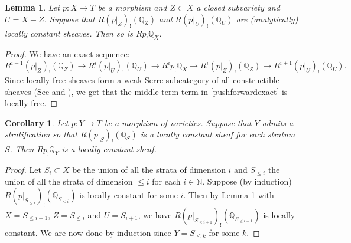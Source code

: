\documentclass[11pt]{amsart}
\newtheorem{corollary}[thm]{Corollary}
\newtheorem{lemma}[thm]{Lemma}
\newcommand{\bQ}{\mathbb{Q}}
\newcommand{\bN}{\mathbb{N}}
\numberwithin{equation}{section}
\renewcommand{\leq}{\leqslant}
\begin{document}
\begin{lemma} \label{lemmalocallyconstantinductionstep}
	Let $p: X \to T$ be a morphism and $Z \subset X$ a closed subvariety and $U = X-Z$. Suppose that $R(p|_Z)_!(\bQ_Z)$ and $R(p|_U)_!(\bQ_U)$ are (analytically) locally constant sheaves. Then so is $Rp_!\bQ_X$.
\end{lemma}
\begin{proof}
	We have an exact sequence:
	\begin{equation} \label{pushforwardexact}
		R^{i-1}(p|_Z)_!(\bQ_Z) \to
		R^i(p|_U)_!(\bQ_U) \to
		R^ip_!\bQ_X \to
		R^i(p|_Z)_!(\bQ_Z) \to
		R^{i+1}(p|_U)_!(\bQ_U).
	\end{equation}
	Since locally free sheaves form a weak Serre subcategory of all constructible sheaves (See
	\cite[Proposition 2.5]{lunts2026categories} and \cite[02MO, 0754]{stacks-project}),
	we get that the middle term term in \eqref{pushforwardexact} is locally free.
\end{proof}

\begin{corollary} \label{corollarystratifiedfibration}
	Let $p : Y \to T$ be a morphism of varieties. Suppose that $Y$ admits a stratification so that
	$R(p|_S)_!(\bQ_S)$ is a locally constant sheaf for each stratum $S$.
	Then $Rp_!\bQ_Y$ is a locally constant sheaf.
\end{corollary}
\begin{proof}
	Let $S_i \subset X$ be the union of all the strata of dimension $i$ and $S_{\leq i}$ the union of all the strata of dimension $\leq i$ for each $i \in \bN$.
	Suppose (by induction) $R(p|_{S_{\leq i}})_!(\bQ_{S_{\leq i}})$ is locally constant for some $i$.
	Then by Lemma \ref{lemmalocallyconstantinductionstep} with $X=S_{\leq i+1}$, $Z=S_{\leq i}$ and $U=S_{i+1}$, we have $R(p|_{S_{\leq i+1}})_!(\bQ_{S_{\leq i+1}})$ is locally constant. We are now done by induction since $Y=S_{\leq k}$ for some $k$.
\end{proof}
\end{document}
